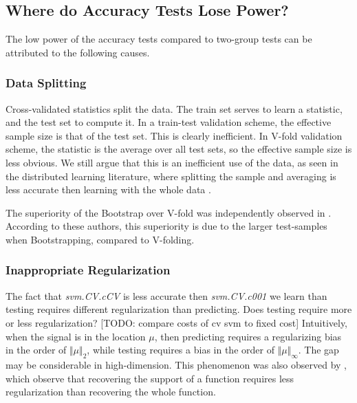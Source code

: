 \documentclass[journal]{IEEEtran}
\begin{document}
\subsection{Where do Accuracy Tests Lose Power?}
The low power of the accuracy tests compared to two-group tests can be attributed to the following causes.

\subsubsection{Data Splitting}
Cross-validated statistics split the data.
The train set serves to learn a statistic, and the test set to compute it.
In a train-test validation scheme, the effective sample size is that of the test set.
This is clearly inefficient. 
In V-fold validation scheme, the statistic is the average over all test sets, so the effective sample size is less obvious. 
We still argue that this is an inefficient use of the data, as seen in the distributed learning literature, where splitting the sample and averaging is less accurate then learning with the whole data \cite{rosenblatt2016optimality}.

The superiority of the Bootstrap over V-fold was independently observed in \cite{yu2007two}. 
According to these authors, this superiority is due to the larger test-samples when Bootstrapping, compared to V-folding.


\subsubsection{Inappropriate Regularization}
The fact that \emph{svm.CV.cCV} is less accurate then \emph{svm.CV.c001} we learn than testing requires different regularization than predicting.
Does testing require more or less regularization?
[TODO: compare costs of cv svm to fixed cost]
Intuitively, when the signal is in the location $\mu$, then predicting requires a regularizing bias in the order of $\Vert \mu \Vert_2$, while testing requires a bias in the order of $\Vert \mu \Vert_\infty$.
The gap may be considerable in high-dimension.
This phenomenon was also observed by \cite{cheng2017multiple}, which observe that recovering the support of a function requires less regularization than recovering the whole function.
\end{document}
